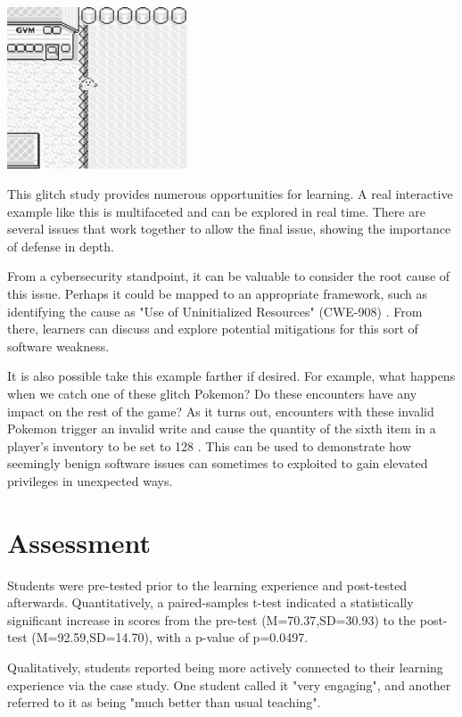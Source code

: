 \documentclass[letterpaper]{article}
\begin{document}
\noindent %
\begin{minipage}{\textwidth}
    \centering
    \includegraphics[width=0.4\textwidth]{surfing.png}
    \label{fig:surfing}
\end{minipage}

This glitch study provides numerous opportunities for learning. A real interactive example like this is multifaceted and can be explored in real time. There are several issues that work together to allow the final issue, showing the importance of defense in depth.

From a cybersecurity standpoint, it can be valuable to consider the root cause of this issue. Perhaps it could be mapped to an appropriate framework, such as identifying the cause as "Use of Uninitialized Resources" (CWE-908) \cite{mitre2012}. From there, learners can discuss and explore potential mitigations for this sort of software weakness.

It is also possible take this example farther if desired. For example, what happens when we catch one of these glitch Pokemon? Do these encounters have any impact on the rest of the game? As it turns out, encounters with these invalid Pokemon trigger an invalid write and cause the quantity of the sixth item in a player's inventory to be set to 128 \cite{bulbapedia2010}. This can be used to demonstrate how seemingly benign software issues can sometimes to exploited to gain elevated privileges in unexpected ways.

\section{Assessment}
Students were pre-tested prior to the learning experience and post-tested afterwards. Quantitatively, a paired-samples t-test indicated a statistically significant increase in scores from the pre-test (M=70.37,SD=30.93) to the post-test (M=92.59,SD=14.70), with a p-value of p=0.0497.

Qualitatively, students reported being more actively connected to their learning experience via the case study. One student called it "very engaging", and another referred to it as being "much better than usual teaching".
\end{document}
